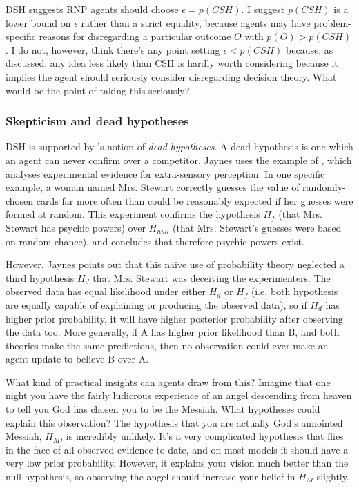 \documentclass{article}
\begin{document}
DSH suggests RNP agents should choose \(\epsilon=p(CSH)\). I suggest \(p(CSH)\) is a lower bound on \(\epsilon\) rather than a strict equality, because agents may have problem-specific reasons for disregarding a particular outcome \(O\) with \(p(O)>p(CSH)\). I do not, however, think there's any point setting \(\epsilon < p(CSH)\) because, as discussed, any idea less likely than CSH is hardly worth considering because it implies the agent should seriously consider disregarding decision theory. What would be the point of taking this seriously?

\subsubsection{Skepticism and dead hypotheses}

DSH is supported by \citep{jaynes2003probability}'s notion of \textit{dead hypotheses}. A dead hypothesis is one which an agent can never confirm over a competitor. Jaynes uses the example of \citep{soal1954modern}, which analyses experimental evidence for extra-sensory perception. In one specific example, a woman named Mrs. Stewart correctly guesses the value of randomly-chosen cards far more often than could be reasonably expected if her guesses were formed at random. This experiment confirms the hypothesis \(H_{f}\) (that Mrs. Stewart has psychic powers) over \(H_{null}\) (that Mrs. Stewart's guesses were based on random chance), and concludes that therefore psychic powers exist. 

However, Jaynes points out that this naive use of probability theory neglected a third hypothesis \(H_{d}\) \textemdash{} that Mrs. Stewart was deceiving the experimenters. The observed data has equal likelihood under either \(H_{d}\) or \(H_{f}\) (i.e. both hypothesis are equally capable of explaining or producing the observed data), so if \(H_{d}\) has higher prior probability, it will have higher posterior probability after observing the data too. More generally, if A has higher prior likelihood than B, and both theories make the same predictions, then no observation could ever make an agent update to believe B over A. 

What kind of practical insights can agents draw from this? Imagine that one night you have the fairly ludicrous experience of an angel descending from heaven to tell you God has chosen you to be the Messiah. What hypotheses could explain this observation? The hypothesis that you are actually God's annointed Messiah, \(H_{M}\), is incredibly unlikely. It's a very complicated hypothesis that flies in the face of all observed evidence to date, and on most models it should have a very low prior probability. However, it explains your vision much better than the null hypothesis, so observing the angel should increase your belief in \(H_{M}\) slightly.
\end{document}
